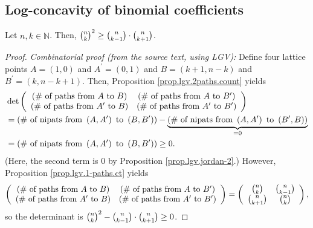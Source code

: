 \subsection{Log-concavity of binomial coefficients}

\begin{corollary}
\label{cor.lgv.binom-unimod}
\leantarget
\leanok
Let $n,k\in\mathbb{N}$. Then, $\dbinom{n}{k}%
^{2}\geq\dbinom{n}{k-1}\cdot\dbinom{n}{k+1}$.
\end{corollary}

\begin{proof}
\leanok
\emph{Combinatorial proof (from the source text, using LGV):}
Define four lattice points
$A=\left(  1,0\right)  $ and $A^{\prime}=\left(  0,1\right)  $ and $B=\left(
k+1,n-k\right)  $ and $B^{\prime}=\left(  k,n-k+1\right)  $. Then, Proposition
\ref{prop.lgv.2paths.count} yields
\begin{align*}
&  \det\left(
\begin{array}
[c]{cc}%
\left(  \text{\# of paths from }A\text{ to }B\right)  & \left(  \text{\# of
paths from }A\text{ to }B^{\prime}\right) \\
\left(  \text{\# of paths from }A^{\prime}\text{ to }B\right)  & \left(
\text{\# of paths from }A^{\prime}\text{ to }B^{\prime}\right)
\end{array}
\right) \\
&  =\left(  \text{\# of nipats from }\left(  A,A^{\prime}\right)  \text{ to
}\left(  B,B^{\prime}\right)  \right)  -\underbrace{\left(  \text{\# of nipats
from }\left(  A,A^{\prime}\right)  \text{ to }\left(  B^{\prime},B\right)
\right)  }_{=0}\\
&  =\left(  \text{\# of nipats from }\left(  A,A^{\prime}\right)  \text{ to
}\left(  B,B^{\prime}\right)  \right)  \geq0.
\end{align*}
(Here, the second term is $0$ by Proposition \ref{prop.lgv.jordan-2}.)
However, Proposition \ref{prop.lgv.1-paths.ct} yields
\[
\left(
\begin{array}
[c]{cc}%
\left(  \text{\# of paths from }A\text{ to }B\right)  & \left(  \text{\# of
paths from }A\text{ to }B^{\prime}\right) \\
\left(  \text{\# of paths from }A^{\prime}\text{ to }B\right)  & \left(
\text{\# of paths from }A^{\prime}\text{ to }B^{\prime}\right)
\end{array}
\right)
=\left(
\begin{array}
[c]{cc}%
\dbinom{n}{k} & \dbinom{n}{k-1}\\
\dbinom{n}{k+1} & \dbinom{n}{k}%
\end{array}
\right),
\]
so the determinant is $\dbinom{n}{k}^{2}-\dbinom{n}%
{k-1}\cdot\dbinom{n}{k+1}\geq 0$.


\end{proof}
